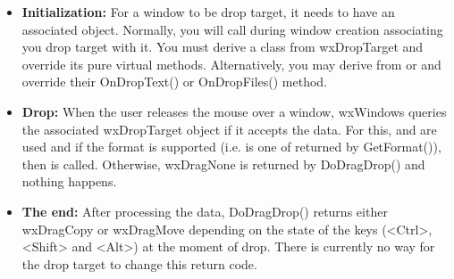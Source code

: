 \begin{itemize}\itemsep=0pt
\item {\bf Initialization:} For a window to be drop target, it needs to have
an associated  object. Normally, you will
call  during window
creation associating you drop target with it. You must derive a class from
wxDropTarget and override its pure virtual methods. Alternatively, you may
derive from  or
 and override their OnDropText()
or OnDropFiles() method.
\item {\bf Drop:} When the user releases the mouse over a window, wxWindows
queries the associated wxDropTarget object if it accepts the data. For
this,  and  are
used and if the format is
supported (i.e. is one of returned by GetFormat()), 
then  is called. 
Otherwise, wxDragNone is returned by DoDragDrop() and
nothing happens.
\item {\bf The end:} After processing the data, DoDragDrop() returns either
wxDragCopy or wxDragMove depending on the state of the keys (<Ctrl>, <Shift>
and <Alt>) at the moment of drop. There is currently no way for the drop
target to change this return code.
\end{itemize}

